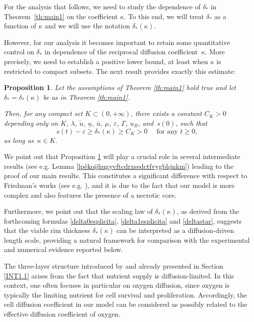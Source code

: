 \documentclass[12pt,a4paper,intlimits,sumlimits]{amsart}
\theoremstyle{definition}
\theoremstyle{plain}
\newtheorem{proposition}[definition]{Proposition}
\numberwithin{equation}{section}
\renewcommand{\ge}{\geqslant}
\begin{document}
{ For the analysis that follows, we need to study the dependence of $\delta_*$ in Theorem~\ref{th:main1}
on the coefficient $\kappa$. To this end, we will treat $\delta_*$ as a function of $\kappa$ and we will use the notation $\delta_*(\kappa)$.


However, for our analysis it becomes important to retain some quantitative control on $\delta_*$ in dependence of
the reciprocal diffusion coefficient~$\kappa$. More precisely, we need to establish a positive lower bound, at least when $\kappa$ is restricted to compact subsets. The next result provides exactly this estimate:
\begin{proposition}\label{propCK>0}
Let the assumptions of Theorem \ref{th:main1} hold true
and let $\delta_*=\delta_*(\kappa)$ be as in Theorem \ref{th:main1}. 

Then, for any compact set $K\subset (0, +\infty)$, there exists a constant $C_K>0$ depending only on $K$, $\lambda$, $\widetilde u$, $\underline u$, $\overline u$, $\mu$, $\varepsilon$, $\Gamma$, $u_B$, and~$ s(0)$, such that
\[
s(t)-\varepsilon\ge\delta_*(\kappa)\ge C_K>0\quad\mbox{ for any } t\ge 0,
\]as long as~$\kappa\in K$.
\end{proposition}

We point out that Proposition \ref{propCK>0} will play a crucial role in several intermediate results (see e.g. Lemma \ref{lpèkoijhugyvftcdrxsedctfvygbhjnkm}) leading to the proof of our main results.  This constitutes a significant difference with respect to Friedman’s works (see e.g. \cite{MR1684873}), and it is due to the fact that our model is more complex and also features the presence of a necrotic core. 

Furthermore, we point out that the scaling law of $\delta_*(\kappa)$, as derived from the forthcoming formulas \eqref{delta0esplicita},  \eqref{delta1esplicita} and \eqref{deltastar}, suggests that the viable rim thickness $\delta_*(\kappa)$ can be interpreted as a diffusion-driven length scale, providing a natural framework for comparison with the experimental and numerical evidence reported below.

The three-layer structure introduced by \cite{greenspan} and already presented in Section \ref{INT1.1} arises from the fact that nutrient supply is diffusion-limited. In this context, one often focuses in particular on oxygen diffusion, since oxygen is typically the limiting nutrient for cell survival and proliferation. Accordingly, the cell diffusion coefficient in our model can be considered as possibly related to the effective diffusion coefficient of oxygen. 

}
\end{document}

